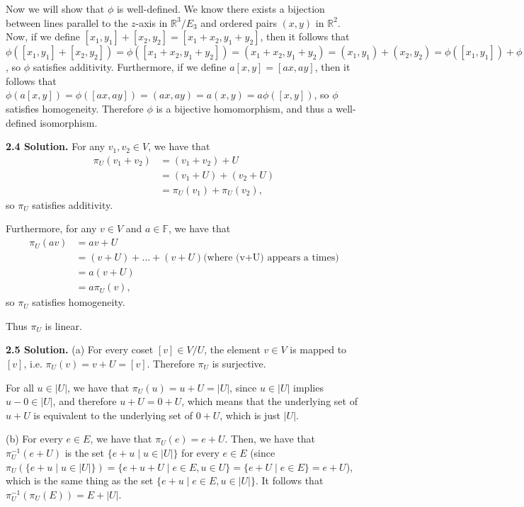 Now we will show that $\phi$ is well-defined. We know there exists a bijection between lines parallel to the $z$-axis in $\mathbb{R}^3/E_3$ and ordered pairs $(x,y)$ in $\mathbb{R}^2$. Now, if we define $[x_1,y_1]+[x_2,y_2] = [x_1+x_2,y_1+y_2]$, then it follows that $\phi([x_1,y_1]+[x_2,y_2]) = \phi([x_1+x_2,y_1+y_2]) = (x_1+x_2,y_1+y_2) = (x_1,y_1)+(x_2,y_2) = \phi([x_1,y_1])+\phi([x_2,y_2])$, so $\phi$ satisfies additivity. Furthermore, if we define $a[x,y] = [ax,ay]$, then it follows that $\phi(a[x,y]) = \phi([ax,ay]) = (ax,ay) = a(x,y) = a\phi([x,y])$, so $\phi$ satisfies homogeneity. Therefore $\phi$ is a bijective homomorphism, and thus a well-defined isomorphism.

\textbf{2.4 Solution.} For any $v_1,v_2\in V$, we have that 
\begin{align*}
    \pi_U(v_1+v_2) &= (v_1+v_2) + U \\
                   &= (v_1+U) + (v_2+U) \\
                   &= \pi_U(v_1) + \pi_U(v_2),
\end{align*}
so $\pi_U$ satisfies additivity.

Furthermore, for any $v\in V$ and $a\in\mathbb{F}$, we have that
\begin{align*}
    \pi_U(av) &= av + U \\
              &= (v+U) + \ldots + (v+U) \text{(where (v+U) appears a times)} \\
              &= a(v+U) \\
              &= a\pi_U(v),
\end{align*}
so $\pi_U$ satisfies homogeneity.

Thus $\pi_U$ is linear.

\textbf{2.5 Solution.} (a) For every coset $[v]\in V/U$, the element $v\in V$ is mapped to $[v]$, i.e. $\pi_U(v)=v+U=[v]$. Therefore $\pi_U$ is surjective. 

For all $u\in|U|$, we have that $\pi_U(u)=u+U=|U|$, since $u\in|U|$ implies $u-0\in|U|$, and therefore $u+U=0+U$, which means that the underlying set of $u+U$ is equivalent to the underlying set of $0+U$, which is just $|U|$.

(b) For every $e\in E$, we have that $\pi_U(e) = e+U$. Then, we have that $\pi_U^{-1}(e+U)$ is the set $\{e+u\mid u\in|U|\}$ for every $e\in E$ (since $\pi_U(\{e+u\mid u\in|U|\}) = \{e+u+U\mid e\in E,u\in U\} = \{e+U\mid e\in E\} = e+U$), which is the same thing as the set $\{e+u\mid e\in E, u\in |U|\}$. It follows that $\pi_U^{-1}(\pi_U(E)) = E+|U|$.

